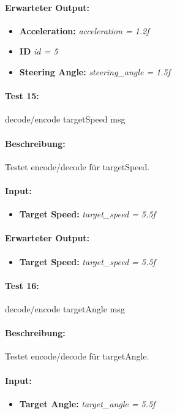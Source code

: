 \documentclass[a4paper, 12pt, titlepage]{scrartcl}
\begin{document}
{			\paragraph{Erwarteter Output:}
			\begin{itemize} \itemsep-0.5em
				\item \textbf{Acceleration:} \emph{acceleration = 1.2f}
				\item \textbf{ID} \emph{id = 5}
				\item \textbf{Steering Angle:} \emph{steering\_angle = 1.5f}
			\end{itemize}
			
			\paragraph{Test 15:}{decode/encode targetSpeed msg}
			\paragraph{Beschreibung:} Testet encode/decode für targetSpeed.
			\paragraph{Input:}
			\begin{itemize} \itemsep-0.5em
				\item \textbf{Target Speed:} \emph{target\_speed = 5.5f}
			\end{itemize}
			\paragraph{Erwarteter Output:}
			\begin{itemize} \itemsep-0.5em
				\item \textbf{Target Speed:} \emph{target\_speed = 5.5f}
			\end{itemize}
			
			\paragraph{Test 16:}{decode/encode targetAngle msg}
			\paragraph{Beschreibung:} Testet encode/decode für targetAngle.
			\paragraph{Input:}
			\begin{itemize} \itemsep-0.5em
				\item \textbf{Target Angle:} \emph{target\_angle = 5.5f}
			\end{itemize}
}
\end{document}
